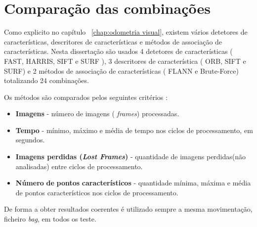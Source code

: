 \section{Comparação das combinações}\label{sec:Tempos}


Como explicito no capítulo ~\ref{chap:odometria visual}, existem vários detetores de características, descritores de características e métodos de associação de características. Nesta dissertação são usados 4 detetores de características ( FAST, HARRIS, SIFT e SURF ), 3 descritores de característica ( ORB, SIFT e SURF)  e 2 métodos de associação de características ( FLANN e Brute-Force)  totalizando 24 combinações.

Os métodos são comparados pelos seguintes critérios :
\begin{itemize}
	\item \textbf{Imagens} - número de imagens ( \textit{frames}) processadas.
	\item \textbf{Tempo} - mínimo, máximo e média de tempo nos ciclos de processamento, em segundos.
	\item \textbf{Imagens perdidas (\textit{Lost Frames})} - quantidade de imagens perdidas(não analisadas) entre ciclos de processamento.
	\item \textbf{Número} \textbf{de} \textbf{pontos} \textbf{característicos} - quantidade mínima, máxima e média de pontos característicos nos ciclos de processamento.
\end{itemize}


De forma a obter resultados coerentes é utilizado sempre a mesma movimentação, ficheiro \textit{bag}, em todos os teste. 




